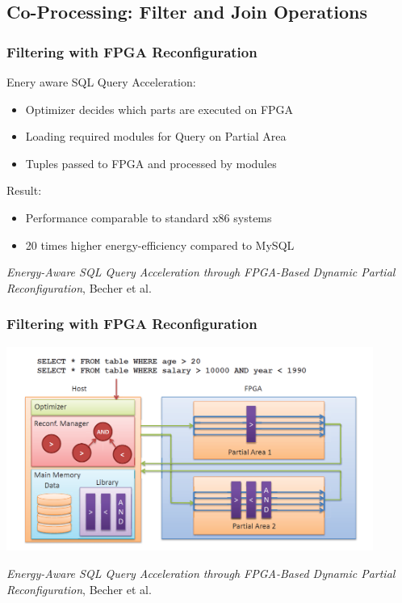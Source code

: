 \documentclass{beamer}
\begin{document}
\subsection{Co-Processing: Filter and Join Operations}
\begin{frame}
\frametitle{Filtering with FPGA Reconfiguration}
Enery aware SQL Query Acceleration:
\begin{itemize}
	\item Optimizer decides which parts are executed on FPGA
	\item Loading required modules for Query on Partial Area
	\item Tuples passed to FPGA and processed by modules
\end{itemize}
\vspace*{0.3cm}
Result:
\begin{itemize}
	\item Performance comparable to standard x86 systems
	\item 20 times higher energy-efficiency compared to MySQL
\end{itemize}
\begin{center}
	\small \emph{Energy-Aware SQL Query Acceleration through FPGA-Based Dynamic Partial Reconfiguration}, Becher et al.
\end{center}
\end{frame}

\begin{frame}
	\frametitle{Filtering with FPGA Reconfiguration}
	\includegraphics[width=0.9\textwidth]{img/reconf.png}
	\begin{center}
		\small \emph{Energy-Aware SQL Query Acceleration through FPGA-Based Dynamic Partial Reconfiguration}, Becher et al.
	\end{center}
\end{frame}
\end{document}
